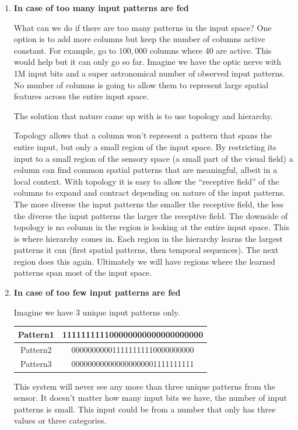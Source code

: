 \documentclass{report}
\begin{document}
\begin{enumerate}
\item {\bf In case of too many input patterns are fed}

What can we do if there are too many patterns in the input space?  One
option is to add more columns but keep the number of columns active
constant.  For example, go to $100,000$ columns where 40 are active.
This would help but it can only go so far.  Imagine we have the optic nerve
with 1M input bits and a super astronomical number of observed input patterns.
No number of columns is going to allow them to represent large spatial
features across the entire input space.

The solution that nature came up with is to use topology and hierarchy.


Topology allows that a column won't represent a pattern that spans the entire
input, but only a small region of the input space.  By restricting its input
to a small region of the sensory space (a small part of the visual field) a
column can find common spatial patterns that are meaningful, albeit in a
local context.  With topology it is easy to allow the ``receptive field'' of
the columns to expand and contract depending on nature of the input
patterns.  The more diverse the input patterns the smaller the receptive
field, the less the diverse the input patterns the larger the receptive
field.  The downside of topology is no column in the region is looking at
the entire input space.   This is where hierarchy comes in.  Each region in the
hierarchy learns the largest patterns it can (first spatial patterns, then
temporal sequences). The next region does this again.  Ultimately we will have
regions where the learned patterns span most of the input space.

\item {\bf In case of too few input patterns are fed}

Imagine we have 3 unique input patterns only.

\begin{tabular}{|c|c|}
\hline
Pattern1 & 111111111100000000000000000000 \\
\hline
Pattern2 & 000000000011111111110000000000 \\
\hline
Pattern3 & 000000000000000000001111111111 \\
\hline
\end{tabular}

This system will never see any more than three unique patterns from the
sensor.  It doesn't matter how many input bits we have, the number of input
patterns is small. This input could be from a number that only has three
values or three categories.


\end{enumerate}
\end{document}
